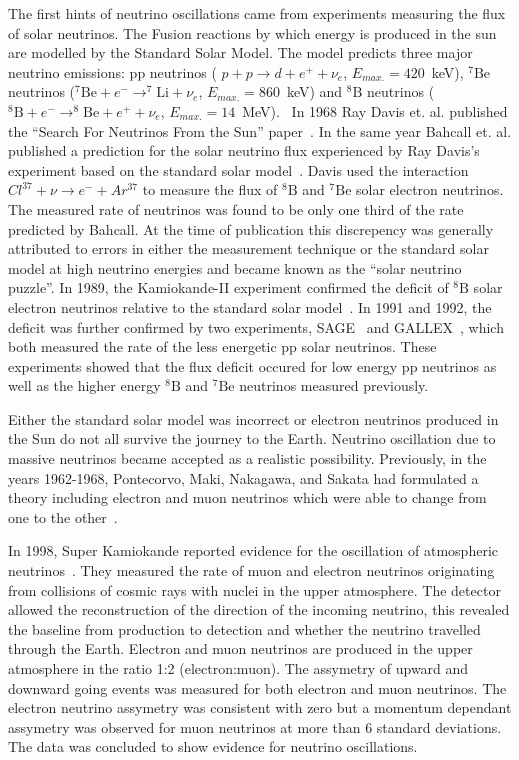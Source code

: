 The first hints of neutrino oscillations came from experiments
measuring the flux of solar neutrinos. The Fusion reactions by which energy
is produced in the sun are modelled by the Standard Solar Model. The model
predicts three major neutrino emissions: pp neutrinos (
$p + p \rightarrow d + e^+ + \nu_e$, $E_{max.}=420$~keV), $^7\text{Be}$
neutrinos ($^7\text{Be} + e^- \rightarrow ^7\text{Li} + \nu_e$, $E_{max.} =
860$~keV) and $^8\text{B}$ neutrinos ($^8\text{B} + e^- \rightarrow
^8\text{Be} + e^+ + \nu_e$, $E_{max.}
=14$~MeV).~\cite{GALLEX:Anselmann:1992um}  
In 1968 Ray Davis et. al. published the ``Search For Neutrinos From the
Sun'' paper~\cite{Davis:PhysRevLett.20.1205}. In the
same year Bahcall et. al. published a prediction for the solar neutrino
flux experienced by Ray Davis's experiment based on the standard solar
model~\cite{BAHCALL1968359}. 
Davis used the 
interaction $Cl^{37}+\nu \rightarrow e^- + Ar^{37}$ to measure the
flux of $^8\text{B}$ and $^7\text{Be}$ solar electron neutrinos.
The measured rate of 
neutrinos was found to be only one third of the rate predicted by
Bahcall. At the time of publication this discrepency was generally 
attributed to errors in either the measurement technique or the
standard solar model at high neutrino energies and became known as the
``solar neutrino puzzle''.  In 1989, the Kamiokande-II experiment
confirmed the deficit of  $^8\text{B}$ solar electron neutrinos
relative to the standard solar
model~\cite{Kamiokande:PhysRevLett.63.16}.   
In 1991 and 1992, the deficit was further
confirmed by two experiments, SAGE~\cite{SAGE:PhysRevLett.67.3332} and  
GALLEX~\cite{GALLEX:Anselmann:1992um}, which both measured the rate of  
the less energetic pp solar neutrinos. These experiments showed that the
flux deficit occured for low energy pp neutrinos as well as the higher
energy $^8\text{B}$ and $^7\text{Be}$ neutrinos measured previously.

Either the standard solar model
was incorrect or electron neutrinos produced in the Sun do not
all survive the journey to the Earth. Neutrino oscillation due to
massive neutrinos became accepted as a realistic possibility.
Previously, in the years 1962-1968, Pontecorvo, Maki, Nakagawa, and
Sakata had
formulated a theory including electron and muon neutrinos which were
able to change from one to the other~\cite{Pontecorvo:1967fh, Gribov:1968kq, Maki:1962mu}. 

In 1998, Super Kamiokande reported evidence for the oscillation of
atmospheric neutrinos~\cite{SK:PhysRevLett.81.1562}. They measured the
rate of muon and electron neutrinos originating from collisions of
cosmic rays with nuclei in the upper atmosphere. The detector allowed
the reconstruction of the direction of the incoming neutrino, 
this revealed the baseline from production to detection and whether
the neutrino travelled through the Earth.
Electron and muon
neutrinos are produced in the upper atmosphere in the ratio 1:2
(electron:muon). 
The assymetry of upward and downward going events was measured for
both electron and muon neutrinos. The electron neutrino assymetry was
consistent with zero but a momentum dependant assymetry was observed
for muon neutrinos at more than 6 standard deviations. The data was
concluded to show evidence for neutrino oscillations.

